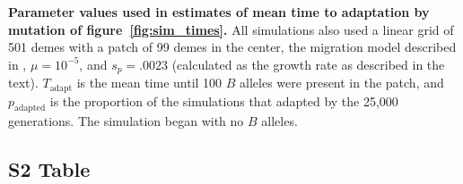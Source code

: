 \documentclass[10pt,letterpaper]{article}
\begin{document}
{
    \textbf{Parameter values used in estimates of mean time to adaptation by mutation of figure~\ref{fig:sim_times}.}
            All simulations also used a linear grid of 501 demes with a patch of 99 demes in the center, 
            the migration model described in ,
            $\mu=10^{-5}$, and $s_p=.0023$ (calculated as the growth rate as described in the text).
            $T_\text{adapt}$ is the mean time until 100 $B$ alleles were present in the patch,
            and $p_\text{adapted}$ is the proportion of the simulations that adapted by the 25,000 generations.
            The simulation began with no $B$ alleles.
            } 

\subsection*{S2 Table}
 \label{stab:migration_params}

%
\end{document}
